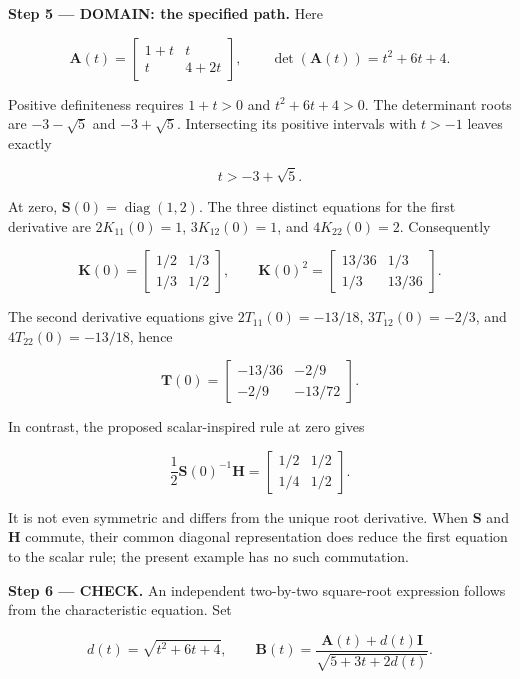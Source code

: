 \documentclass[11pt,oneside,openany]{book}
\begin{document}
\endgroup
\begin{DomainStep}
\textbf{Step 5 --- DOMAIN: the specified path.} Here

\[
\mathbf A(t)=\begin{bmatrix}1+t&t\\t&4+2t\end{bmatrix},\qquad
\det(\mathbf A(t))=t^2+6t+4.
\]

Positive definiteness requires \(1+t>0\) and \(t^2+6t+4>0\). The determinant roots are \(-3-\sqrt5\) and \(-3+\sqrt5\). Intersecting its positive intervals with \(t>-1\) leaves exactly

\[
t>-3+\sqrt5.
\]

At zero, \(\mathbf S(0)=\operatorname{diag}(1,2)\). The three distinct equations for the first derivative are \(2K_{11}(0)=1\), \(3K_{12}(0)=1\), and \(4K_{22}(0)=2\). Consequently

\[
\mathbf K(0)=\begin{bmatrix}1/2&1/3\\1/3&1/2\end{bmatrix},\qquad
\mathbf K(0)^2=\begin{bmatrix}13/36&1/3\\1/3&13/36\end{bmatrix}.
\]

The second derivative equations give \(2T_{11}(0)=-13/18\), \(3T_{12}(0)=-2/3\), and \(4T_{22}(0)=-13/18\), hence

\[
\mathbf T(0)=\begin{bmatrix}-13/36&-2/9\\-2/9&-13/72\end{bmatrix}.
\]

In contrast, the proposed scalar-inspired rule at zero gives

\[
\frac12\mathbf S(0)^{-1}\mathbf H
=\begin{bmatrix}1/2&1/2\\1/4&1/2\end{bmatrix}.
\]

It is not even symmetric and differs from the unique root derivative. When \(\mathbf S\) and \(\mathbf H\) commute, their common diagonal representation does reduce the first equation to the scalar rule; the present example has no such commutation.

\end{DomainStep}
\textbf{Step 6 --- CHECK.} An independent two-by-two square-root expression follows from the characteristic equation. Set

\[
d(t)=\sqrt{t^2+6t+4},\qquad
\mathbf B(t)=\frac{\mathbf A(t)+d(t)\mathbf I}{\sqrt{5+3t+2d(t)}}.
\]
\end{document}
